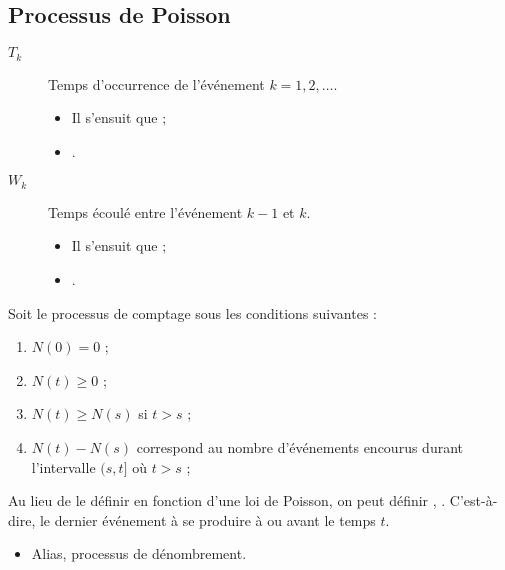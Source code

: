 \documentclass[10pt, french]{article}
\begin{document}
\begin{multicols*}{2}
\section{Processus de Poisson}
\begin{distributions}[Notation]
\begin{description}
	\item[$T_{k}$]	Temps d'occurrence de l'événement $k	=	1, 2, \dots$.
		\begin{itemize}
		\item	Il s'ensuit que  ;
		\item	{}.
		\end{itemize}
	\item[$W_{k}$]	Temps écoulé entre l'événement $k - 1$ et $k$.
		\begin{itemize}
		\item	Il s'ensuit que  ;
		\item	{}.
		\end{itemize}
\end{description}
\end{distributions}

\begin{definitionNOHFILL}
Soit le processus de comptage  sous les conditions suivantes :
\begin{enumerate}
	\item	$N(0)	=	0$ ;
	\item	$N(t)	\geq	0$ ;
	\item	$N(t)	\geq	N(s)$ si $t	>	s$ ;
	\item	$N(t) - N(s)$ correspond au nombre d'événements encourus durant l'intervalle $(s, t]$ où $t	>	s$ ;
\end{enumerate}

Au lieu de le définir en fonction d'une loi de Poisson, on peut définir , . C'est-à-dire, le dernier événement à se produire à ou avant le temps $t$.

\tcbline

\begin{itemize}
	\item	Alias, processus de dénombrement.
\end{itemize}
\end{definitionNOHFILL}



\end{multicols*}
\end{document}

